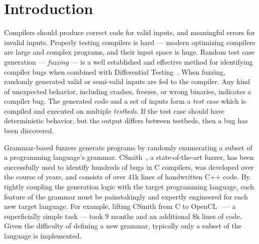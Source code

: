 \section{Introduction}\label{sec:intro}

\noindent
Compilers should produce correct code for valid inputs, and meaningful errors for invalid inputs. Properly testing compilers is hard --- modern optimizing compilers are large and complex programs, and their input space is huge. Random test case generation --- \emph{fuzzing} --- is a well established and effective method for identifying compiler bugs when combined with Differential Testing~\cite{Kossatchev2005}.  When fuzzing, randomly generated valid or semi-valid inputs are fed to the compiler. Any kind of unexpected behavior, including crashes, freezes, or wrong binaries, indicates a compiler bug. The generated code and a set of inputs form a \emph{test case} which is compiled and executed on multiple \emph{testbeds}. If the test case should have deterministic behavior, but the output differs between testbeds, then a bug has been discovered.

Grammar-based fuzzers generate programs by randomly enumerating a subset of a programming language's grammar. CSmith~\cite{Yang2011}, a state-of-the-art fuzzer, has been successfully used to identify hundreds of bugs in C compilers, was developed over the course of years, and consists of over 41k lines of handwritten C++ code. By tightly coupling the generation logic with the target programming language, each feature of the grammar must be painstakingly and expertly engineered for each new target language. For example, lifting CSmith from C to OpenCL~\cite{Lidbury2015a} --- a superficially simple task --- took 9 months and an additional 8k lines of code. Given the difficulty of defining a new grammar, typically only a subset of the language is implemented. 

